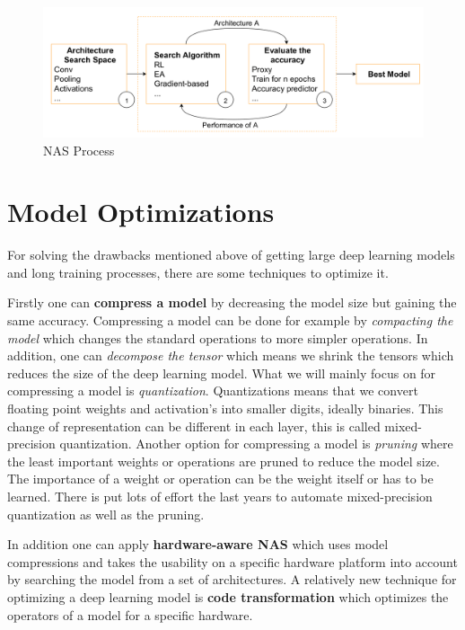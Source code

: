 \documentclass[conference]{IEEEtran}
\begin{document}
\begin{figure}[htbp]
\centerline{\includegraphics[width=\linewidth]{NASProcess.png}}
\caption{NAS Process\cite{bib1}}
\label{fig:NASProcess}
\end{figure}

\section{Model Optimizations}
\label{section:ModelOptimization}
For solving the drawbacks mentioned above of getting large deep learning models and long training processes, there are some techniques to optimize it.

Firstly one can \textbf{compress a model} by decreasing the model size but gaining the same accuracy. Compressing a model can be done for example by \textit{compacting the model} which changes the standard operations to more simpler operations. In addition, one can \textit{decompose the tensor} which means we shrink the tensors which reduces the size of the deep learning model. What we will mainly focus on for compressing a model is \textit{quantization}. Quantizations means that we convert floating point weights and activation's into smaller digits, ideally binaries. This change of representation can be different in each layer, this is called mixed-precision quantization. Another option for compressing a model is \textit{pruning} where the least important weights or operations are pruned to reduce the model size. The importance of a weight or operation can be the weight itself or has to be learned. There is put lots of effort the last years to automate mixed-precision quantization as well as the pruning. 

In addition one can apply \textbf{hardware-aware NAS} which uses model compressions and takes the usability on a specific hardware platform into account by searching the model from a set of architectures. A relatively new technique for optimizing a deep learning model is \textbf{code transformation} which optimizes the operators of a model for a specific hardware.
\end{document}
